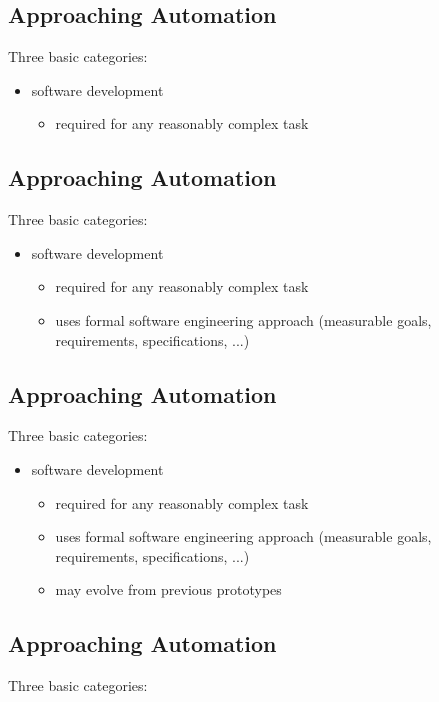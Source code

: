 \documentclass[xga]{xdvislides}
\begin{document}
\subsection{Approaching Automation}
Three basic categories:
\\

\begin{itemize}
	\item software development
		\begin{itemize}
			\item required for any reasonably complex task
		\end{itemize}
\end{itemize}

\subsection{Approaching Automation}
Three basic categories:
\\

\begin{itemize}
	\item software development
		\begin{itemize}
			\item required for any reasonably complex task
			\item uses formal software engineering approach (measurable goals,
				requirements, specifications, ...)
		\end{itemize}
\end{itemize}

\subsection{Approaching Automation}
Three basic categories:
\\

\begin{itemize}
	\item software development
		\begin{itemize}
			\item required for any reasonably complex task
			\item uses formal software engineering approach (measurable goals,
				requirements, specifications, ...)
			\item may evolve from previous prototypes
		\end{itemize}
\end{itemize}


\subsection{Approaching Automation}
Three basic categories:
\\
\end{document}

